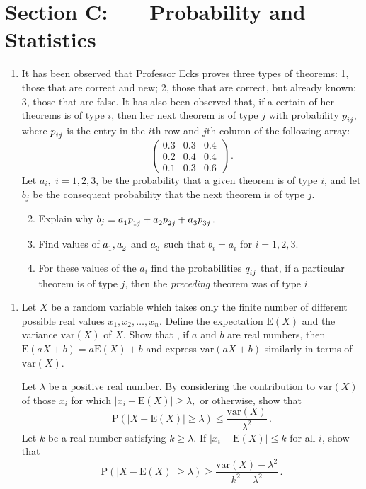 \documentclass[a4, 11pt]{report}
\newlength{\qspace}
\newcounter{qnumber}
\newenvironment{question}%
 {\vspace{\qspace}
  \begin{enumerate}[\bfseries 1\quad][10]%
    \setcounter{enumi}{\value{qnumber}}%
    \item%
 }
{
  \end{enumerate}
  \filbreak
  \stepcounter{qnumber}
 }
\newenvironment{questionparts}[1][1]%
 {
  \begin{enumerate}[\bfseries (i)]%
    \setcounter{enumii}{#1}
    \addtocounter{enumii}{-1}
    \setlength{\itemsep}{5mm}
    \setlength{\parskip}{8pt}
 }
 {
  \end{enumerate}
 }
\newcommand{\low}{^{\vphantom{()}}}
\begin{document}
	
	\newpage
\section*{Section C: \ \ \ Probability and Statistics}


\begin{question}

It has been observed that Professor Ecks proves three types of theorems:
1, those that are correct and new; 2, those that are correct, but
already known; 3, those that are false. It has also been observed
that, if a certain of her theorems is of type $i$, then her next
theorem is of type $j$ with probability $p\low_{ij},$ where $p\low_{ij}$
is the entry in the $i$th row and $j$th column of the following
array: 
\[
\begin{pmatrix}0.3 & 0.3 & 0.4\\
0.2 & 0.4 & 0.4\\
0.1 & 0.3 & 0.6
\end{pmatrix}\,.
\]
Let $a_{i},$ $i=1,2,3$, be the probability that a given theorem
is of type $i$, and let $b_{j}$ be the consequent probability that
the next theorem is of type $j$. 

\begin{questionparts}
\item Explain why $b_{j}=a\low_{1}p\low_{1j}+a\low_{2}p\low_{2j}+a\low_{3}p\low_{3j}\,.$
\item Find values of $a\low_{1},a\low_{2}$ and $a\low_{3}$ such that $b_{i}=a_{i}$
for $i=1,2,3.$
\item For these values of the $a_{i}$ find the probabilities $q\low_{ij}$
that, if a particular theorem is of type $j$, then the \textit{preceding
}theorem was of type $i$. 
\end{questionparts}
\end{question}

\begin{question}
Let $X$ be a random variable which takes only the finite number of
different possible real values $x_{1},x_{2},\ldots,x_{n}.$ Define
the expectation $\mathrm{E}(X)$ and the variance $\mathrm{var}(X)$
of $X$. Show that , if $a$ and $b$ are real numbers, then $\mathrm{E}(aX+b)=a\mathrm{E}(X)+b$
and express $\mathrm{var}(aX+b)$ similarly in terms of $\mathrm{var}(X)$. 


Let $\lambda$ be a positive real number. By considering the contribution
to $\mathrm{var}(X)$ of those $x_{i}$ for which $\left|x_{i}-\mathrm{E}(X)\right|\geqslant\lambda,$
or otherwise, show that 
\[
\mathrm{P}\left(\left|X-\mathrm{E}(X)\right|\geqslant\lambda\right)\leqslant\frac{\mathrm{var}(X)}{\lambda^{2}}\,.
\]
Let $k$ be a real number satisfying $k\geqslant\lambda.$ If $\left|x_{i}-\mathrm{E}(X)\right|\leqslant k$
for all $i$, show that 
\[
\mathrm{P}\left(\left|X-\mathrm{E}(X)\right|\geqslant\lambda\right)\geqslant\frac{\mathrm{var}(X)-\lambda^{2}}{k^{2}-\lambda^{2}}\,.
\]
\end{question}
\end{document}
